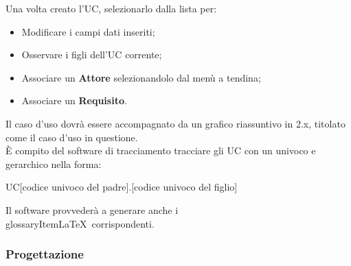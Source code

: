       Una volta creato l'UC, selezionarlo dalla lista per:
      \begin{itemize}
        \item Modificare i campi dati inseriti;
        \item Osservare i figli dell'UC corrente;
        \item Associare un \textbf{Attore} selezionandolo dal menù a tendina;
        \item Associare un \textbf{Requisito}.
      \end{itemize}
      Il caso d'uso dovrà essere accompagnato da un grafico riassuntivo in 2.x, titolato come il caso d'uso in questione.\\
      È compito del software di tracciamento tracciare gli UC con un  univoco e gerarchico nella forma:
      \begin{center}
        UC[codice univoco del padre].[codice univoco del figlio]
      \end{center}
      Il software provvederà a generare anche i  \\glossaryItem{LaTeX}\ corrispondenti.
\subsubsection{Progettazione}
